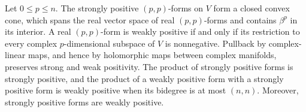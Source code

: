 \begin{proposition}\label{prop:positivity-cones}
Let $0\leq p\leq n$. The strongly positive $(p,p)$-forms on $V$ form a closed convex cone, which spans the real vector space of real $(p,p)$-forms and contains $\beta^p$ in its interior. A real $(p,p)$-form is weakly positive if and only if its restriction to every complex $p$-dimensional subspace of $V$ is nonnegative. Pullback by complex-linear maps, and hence by holomorphic maps between complex manifolds, preserves strong and weak positivity. The product of strongly positive forms is strongly positive, and the product of a weakly positive form with a strongly positive form is weakly positive when its bidegree is at most $(n,n)$. Moreover, strongly positive forms are weakly positive.
\end{proposition}
